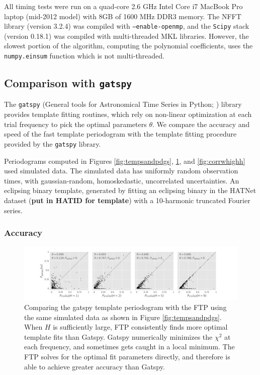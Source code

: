 \documentclass[iop]{emulateapj}
\newcommand{\todo}[1]{{\bf #1}}
\begin{document}
All timing tests were run on a quad-core 2.6 GHz Intel Core i7 MacBook 
Pro laptop (mid-2012 model) with 8GB of 1600 MHz DDR3 memory. The NFFT
library (version 3.2.4) was compiled with \texttt{--enable-openmp}, and
the \texttt{Scipy} stack (version 0.18.1) was compiled with multi-threaded MKL libraries.
However, the slowest portion of the algorithm, computing the polynomial
coefficients, uses the \texttt{numpy.einsum} function which is not
multi-threaded. 

\subsection{Comparison with \texttt{gatspy}}

The \texttt{gatspy} (General tools for Astronomical Time Series in Python; 
\cite{gatspy,Vanderplas+Ivezic_2015}) library provides template fitting
routines, which rely on non-linear optimization at each trial frequency
to pick the optimal parameters $\theta$. We compare the accuracy and
speed of the fast template periodogram with the template fitting
procedure provided by the \texttt{gatspy} library.

Periodograms computed in Figures \ref{fig:tempsandpdgs}, \ref{fig:corrwgats},
and \ref{fig:corrwhighh} used simulated data. The simulated data has uniformly
random observation times, with gaussian-random, homoskedastic, uncorrelated 
uncertainties. An eclipsing binary template, generated by fitting an
eclipsing binary in the HATNet dataset (\todo{put in HATID for template})
with a 10-harmonic truncated Fourier series.

\subsubsection{Accuracy}

\begin{figure}
    \centering
    \includegraphics[width=\textwidth]{plots/correlation_with_gatspy.png}
    \caption{\label{fig:corrwgats} Comparing the gatspy template periodogram with 
            the FTP using the same simulated data as shown in Figure \ref{fig:tempsandpdgs}.
            When $H$ is sufficiently large, FTP consistently finds more optimal template
            fits than Gatspy. Gatspy numerically minimizes the $\chi^2$ at each frequency,
            and sometimes gets caught in a local minimum. The FTP solves for the optimal
            fit parameters directly, and therefore is able to achieve greater accuracy than Gatspy.}
\end{figure}
\end{document}
